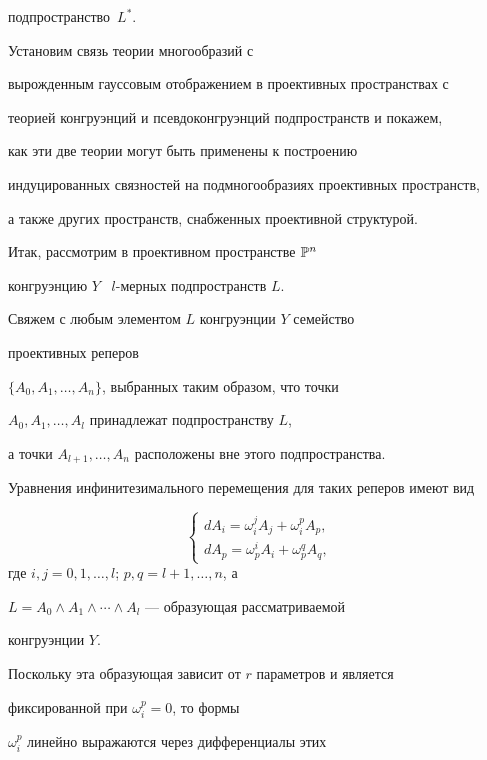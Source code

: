 подпространство~$L^*$.





 Установим связь теории многообразий с


вырожденным гауссовым отображением в проективных пространствах с


теорией конгруэнций и псевдоконгруэнций подпространств и покажем,


как эти две теории могут быть применены к построению


индуцированных связностей на подмногообразиях проективных пространств,


а также других пространств, снабженных проективной структурой.



Итак, рассмотрим в проективном пространстве $\Bbb{P}^n$


конгруэнцию $Y$ \ $l$-мерных подпространств $L$.


Свяжем с любым элементом $L$ конгруэнции $Y$ семейство


проективных реперов


$\{A_0, A_1, \dotsc , A_n\}$, выбранных таким образом, что точки


$A_0, A_1, \dotsc , A_l$ принадлежат подпространству $L$,


а точки $A_{l+1}, \dotsc , A_n$ расположены вне этого подпространства.


Уравнения инфинитезимального перемещения для таких реперов имеют вид


\begin{equation}


\label{14}


\begin{cases}


dA_i = \omega_i^j A_j + \omega_i^p A_p, \\
dA_p = \omega_p^i A_i + \omega_p^q A_q, 
\end{cases}


\end{equation}
где $i, j = 0, 1, \dotsc, l$; $p, q = l + 1, \dotsc , n$, а


$L = A_0 \wedge A_1\wedge \dotsb \wedge A_l$ --- образующая рассматриваемой


конгруэнции $Y$.


 Поскольку эта образующая зависит от $r$ параметров и является


фиксированной при $\omega_i^p = 0$, то формы


$\omega_i^p$ линейно выражаются через дифференциалы этих


